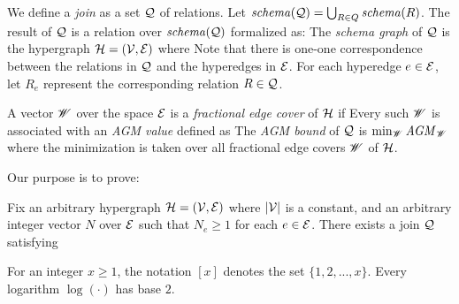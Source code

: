 





We define a {\em join} as a set $\mathcal{Q}$ of relations. Let $\mathit{schema}(\mathcal{Q}) = \bigcup_{R \in Q} \mathit{schema}(R)$. The result of $\mathcal{Q}$ is a relation over $\mathit{schema}(\mathcal{Q})$ formalized as:
The {\em schema graph} of $\mathcal{Q}$ is the hypergraph $\mathcal{H} = (\mathcal{V}, \mathcal{E})$ where
Note that there is one-one correspondence between the relations in $\mathcal{Q}$ and the hyperedges in $\mathcal{E}$. For each hyperedge $e \in \mathcal{E}$, let $R_e$ represent the corresponding relation $R \in \mathcal{Q}$.

\vgap

A vector $\mathscr{W}$ over the space $\mathcal{E}$ is a {\em fractional edge cover} of $\mathcal{H}$ if
Every such $\mathscr{W}$ is associated with an {\em AGM value} defined as
The {\em AGM bound} of $\mathcal{Q}$ is $\min_{\mathscr{W}} \mathit{AGM}_{\mathscr{W}}$ where the minimization is taken over all fractional edge covers $\mathscr{W}$ of $\mathcal{H}$.

\vgap


Our purpose is to prove:

\begin{theorem} \label{thm:agm-tight}
   Fix an arbitrary hypergraph $\mathcal{H} = (\mathcal{V}, \mathcal{E})$ where $|\mathcal{V}|$ is a constant, and an arbitrary integer vector $N$ over $\mathcal{E}$ such that $N_e \ge 1$ for each $e \in \mathcal{E}$. There exists a join $\mathcal{Q}$ satisfying
\end{theorem}

 For an integer $x \ge 1$, the notation $[x]$ denotes the set $\{1, 2, ..., x\}$. Every logarithm $\log(\cdot)$ has base $2$.

